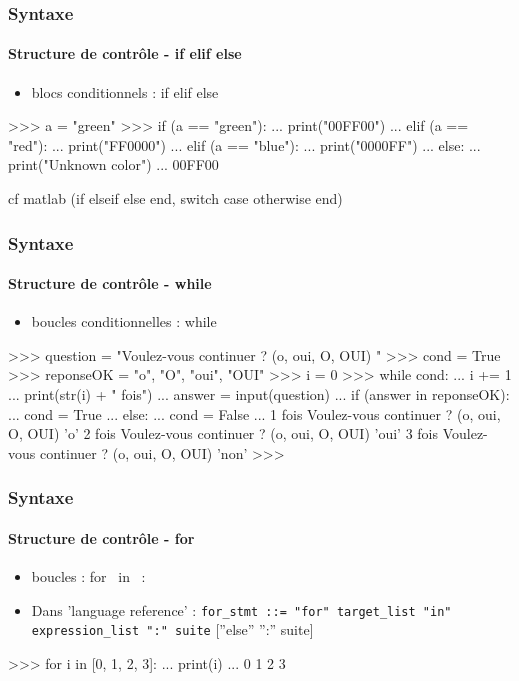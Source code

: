 \begin{frame}[fragile]
\frametitle{Syntaxe}
\framesubtitle{Structure de contrôle - if elif else}
\begin{itemize}
\item blocs conditionnels : if elif else
\end{itemize}
\begin{pythonConsole}
>>> a = "green"
>>> if (a == "green"): 
...     print("00FF00")
... elif (a == "red"): 
...     print("FF0000")
... elif (a == "blue"): 
...     print("0000FF")
... else: 
...     print("Unknown color")
...
00FF00
\end{pythonConsole}
cf matlab (if elseif else end, switch case otherwise end) 
\end{frame}
\begin{frame}[fragile]
\frametitle{Syntaxe}
\framesubtitle{Structure de contrôle - while}
\begin{itemize}
\item boucles conditionnelles : while
\end{itemize}
\begin{pythonConsole}
>>> question = "Voulez-vous continuer ? (o, oui, O, OUI) "
>>> cond = True
>>> reponseOK = {"o", "O", "oui", "OUI"}
>>> i = 0
>>> while cond:
...    i += 1
...    print(str(i) + " fois")
...    answer = input(question)
...    if (answer in reponseOK): 
...        cond = True
...    else: 
...        cond = False
...
1 fois 
Voulez-vous continuer ? (o, oui, O, OUI) 'o'
2 fois 
Voulez-vous continuer ? (o, oui, O, OUI) 'oui'
3 fois
Voulez-vous continuer ? (o, oui, O, OUI) 'non'
>>> 
\end{pythonConsole}
\end{frame}
\begin{frame}[fragile]
\frametitle{Syntaxe}
\framesubtitle{Structure de contrôle - for}
\begin{itemize}
\item boucles : for \ in \ :
\item Dans 'language reference' : \lstinline{for_stmt ::= "for" target_list "in" expression_list ":" suite}
[”else” ”:” suite]
\end{itemize}
\begin{pythonConsole}
>>> for i in [0, 1, 2, 3]: 
...     print(i)
... 
0
1
2
3
\end{pythonConsole}
\end{frame}
